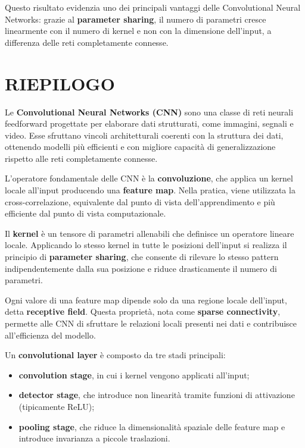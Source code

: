 \documentclass[a4paper,12pt]{report}
\begin{document}
Questo risultato evidenzia uno dei principali vantaggi delle Convolutional Neural Networks:  
grazie al \textbf{parameter sharing}, il numero di parametri cresce linearmente con il numero di kernel e non con la dimensione dell’input, a differenza delle reti completamente connesse.

\section*{RIEPILOGO}

\begin{tcolorbox}[
    colback=green!5,
    colframe=green!50!black,
    title=Convolutional Neural Networks,
    breakable
]

Le \textbf{Convolutional Neural Networks (CNN)} sono una classe di reti neurali feedforward progettate per elaborare dati strutturati, come immagini, segnali e video.  
Esse sfruttano vincoli architetturali coerenti con la struttura dei dati, ottenendo modelli più efficienti e con migliore capacità di generalizzazione rispetto alle reti completamente connesse.

L’operatore fondamentale delle CNN è la \textbf{convoluzione}, che applica un kernel locale all’input producendo una \textbf{feature map}.  
Nella pratica, viene utilizzata la cross-correlazione, equivalente dal punto di vista dell’apprendimento e più efficiente dal punto di vista computazionale.

Il \textbf{kernel} è un tensore di parametri allenabili che definisce un operatore lineare locale.  
Applicando lo stesso kernel in tutte le posizioni dell’input si realizza il principio di \textbf{parameter sharing}, che consente di rilevare lo stesso pattern indipendentemente dalla sua posizione e riduce drasticamente il numero di parametri.

Ogni valore di una feature map dipende solo da una regione locale dell’input, detta \textbf{receptive field}.  
Questa proprietà, nota come \textbf{sparse connectivity}, permette alle CNN di sfruttare le relazioni locali presenti nei dati e contribuisce all’efficienza del modello.

Un \textbf{convolutional layer} è composto da tre stadi principali:
\begin{itemize}
    \item \textbf{convolution stage}, in cui i kernel vengono applicati all’input;
    \item \textbf{detector stage}, che introduce non linearità tramite funzioni di attivazione (tipicamente ReLU);
    \item \textbf{pooling stage}, che riduce la dimensionalità spaziale delle feature map e introduce invarianza a piccole traslazioni.
\end{itemize}


\end{tcolorbox}
\end{document}
